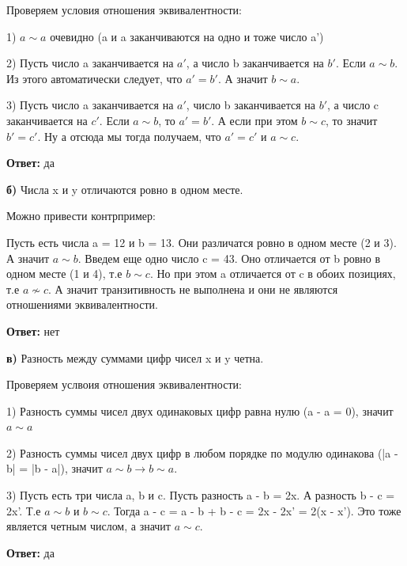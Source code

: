 \documentclass[a4paper,12pt]{article}
\begin{document}
Проверяем условия отношения эквивалентности:

1) $a \sim a$ очевидно (a и a заканчиваются на одно и тоже число a')

2) Пусть число a заканчивается на $a'$, а число b  заканчивается на $b'$. Если $a \sim b$. Из этого автоматически следует, что $a' = b'$. А значит $b \sim a$.

3) Пусть число a заканчивается на $a'$,  число b  заканчивается на $b'$, а число c заканчивается на $c'$. Если $a \sim b$, то $a' = b'$. А если при этом $b \sim c$, то значит $b' = c'$. Ну а отсюда мы тогда получаем, что $a' = c'$ и $a \sim c$.
\begin{center}
\textbf{Ответ: } да
\end{center}
\textbf{б)} Числа x и y отличаются ровно в одном месте.

Можно привести контрпример:

Пусть есть числа a = 12 и b = 13. Они различатся ровно в одном месте (2 и 3). А значит $a \sim b$. Введем еще одно число c = 43. Оно отличается от b ровно в одном месте (1 и 4), т.е $b \sim c$. Но при этом a отличается от c в обоих позициях, т.е $a \nsim c$. А значит транзитивность не выполнена и они не являются отношениями эквивалентности.
\begin{center}
\textbf{Ответ: } нет
\end{center}

\textbf{в)} Разность между суммами цифр чисел x  и y четна.

Проверяем услвоия отношения эквивалентности:

1) Разность суммы чисел двух одинаковых цифр равна нулю (a - a = 0), значит $ a \sim a$

2) Разность суммы чисел двух цифр в любом порядке по модулю одинакова (|a - b| = |b - a|), значит $a \sim b \rightarrow b \sim a$.

3) Пусть есть три числа a, b и c. Пусть разность a - b = 2x. А разность b - c = 2x'. Т.е $a \sim b$ и $b \sim c$.  Тогда a - c = a - b + b - c = 2x - 2x' = 2(x - x'). Это тоже является четным числом, а значит $a \sim c$.

\begin{center}
\textbf{Ответ: } да
\end{center}
\end{document}
